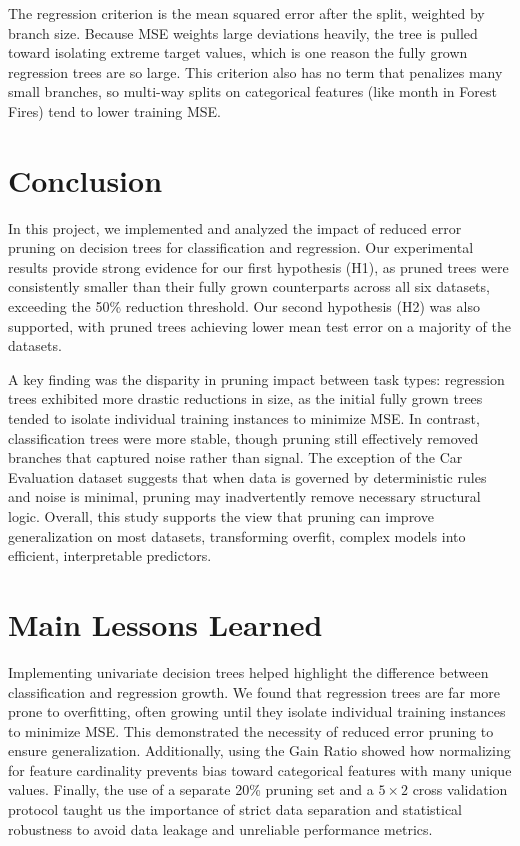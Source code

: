 \documentclass[twoside,11pt]{article}
\begin{document}
The regression criterion is the mean squared error after the split, weighted by branch size. Because MSE weights large deviations heavily, the tree is pulled toward isolating extreme target values, which is one reason the fully grown regression trees are so large. This criterion also has no term that penalizes many small branches, so multi-way splits on categorical features (like month in Forest Fires) tend to lower training MSE.

\section{Conclusion}
In this project, we implemented and analyzed the impact of reduced error pruning on decision trees for classification and regression. Our experimental results provide strong evidence for our first hypothesis (H1), as pruned trees were consistently smaller than their fully grown counterparts across all six datasets, exceeding the 50\% reduction threshold. Our second hypothesis (H2) was also supported, with pruned trees achieving lower mean test error on a majority of the datasets.

A key finding was the disparity in pruning impact between task types: regression trees exhibited more drastic reductions in size, as the initial fully grown trees tended to isolate individual training instances to minimize MSE. In contrast, classification trees were more stable, though pruning still effectively removed branches that captured noise rather than signal. The exception of the Car Evaluation dataset suggests that when data is governed by deterministic rules and noise is minimal, pruning may inadvertently remove necessary structural logic. Overall, this study supports the view that pruning can improve generalization on most datasets, transforming overfit, complex models into efficient, interpretable predictors.



\newpage

\appendix
\section{Main Lessons Learned}
Implementing univariate decision trees helped highlight the difference between classification and regression growth. We found that regression trees are far more prone to overfitting, often growing until they isolate individual training instances to minimize MSE. This demonstrated the necessity of reduced error pruning to ensure generalization. Additionally, using the Gain Ratio showed how normalizing for feature cardinality prevents bias toward categorical features with many unique values. Finally, the use of a separate 20\% pruning set and a $5 \times 2$ cross validation protocol taught us the importance of strict data separation and statistical robustness to avoid data leakage and unreliable performance metrics.
\end{document}
